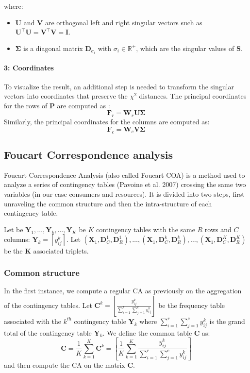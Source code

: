 where:
\begin{itemize}
    \item $\mathbf{U}$ and $\mathbf{V}$ are orthogonal left and right singular vectors such as $\mathbf{U}^\intercal\mathbf{U} = \mathbf{V}^\intercal\mathbf{V} = \mathbf{I}$.
    \item  $\mathbf{\Sigma}$ is a diagonal matrix $\mathbf{D}_{\sigma_i}$ with $\sigma_i \in \mathbb{R}^+$, which are the singular values of $\mathbf{S}$.
\end{itemize}


\paragraph{3: Coordinates}

To visualize the result, an additional step is needed to transform the singular vectors into coordinates that preserve the $\chi^2$ distances. The principal coordinates for the rows of $\mathbf{P}$ are computed as :
$$
    \mathbf{F}_r = \mathbf{W}_r \mathbf{U} \mathbf{\Sigma}
$$
Similarly, the principal coordinates for the columns are computed as:
$$
    \mathbf{F}_c = \mathbf{W}_c \mathbf{V} \mathbf{\Sigma}
$$ 


\subsection{Foucart Correspondence analysis}

Foucart Correspondence Analysis (also called Foucart COA) is a method used to analyze a series of contingency tables (Pavoine et al. 2007) crossing the same two variables (in our case consumers and resources).
It is divided into two steps, first unraveling the common structure and then the intra-structure of each contingency table.

Let be $\mathbf{Y}_1, \ldots, \mathbf{Y}_k, \ldots, \mathbf{Y}_K$ be $K$ contingency tables with the same $R$ rows and $C$ columns: $\mathbf{Y}_k = [y_{ij}^k]$. 
Let $(\mathbf{X}_1, \mathbf{D}_C^1, \mathbf{D}_R^1), \ldots, (\mathbf{X}_1, \mathbf{D}_C^k, \mathbf{D}_R^k), \ldots, (\mathbf{X}_1, \mathbf{D}_C^K, \mathbf{D}_R^K)$ be the $\mathbf{K}$ associated triplets.

\subsubsection{Common structure}

In the first instance, we compute a regular CA as previously on the aggregation of the contingency tables.
Let $\mathbf{C}^k = \left[ \frac{y_{ij}^k}{\sum_{i=1}^{r} \sum_{j=1}^{c} y_{ij}^k} \right]$ be the frequency table associated with the $k^{th}$ contingency table $\mathbf{Y}_k$ where $\sum_{i=1}^{r} \sum_{j=1}^{c} y_{ij}^k$ is the grand total of the contingency table $\mathbf{Y}_k$.
We define the common table $\mathbf{C}$ as:
$$
    \mathbf{C} = \frac{1}{K} \sum_{k=1}^K \mathbf{C}^k = \left[ \frac{1}{K}\sum_{k=1}^{K}\frac{y_{ij}^k}{\sum_{i=1}^{r} \sum_{j=1}^{c} y_{ij}^k} \right]
$$
and then compute the CA on the matrix $\mathbf{C}$.

